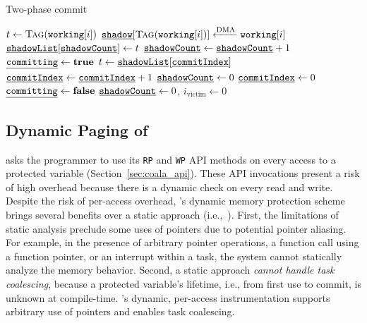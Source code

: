 \begin{algorithm}[t]
	\caption{Two-phase commit}
	\label{algo:commit}
	\small
	\begin{algorithmic}[1]
         
                \State $t \gets \Call{Tag}{\texttt{working}[i]}$
                \State $\texttt{\underline{shadow}}[\Call{Tag}{\texttt{working}[i]}] \xleftarrow{\text{DMA}} \texttt{working}[i]$
                \State $\texttt{\underline{shadowList}}[\texttt{\underline{shadowCount}}] \gets t$
                \State $\texttt{\underline{shadowCount}} \gets \texttt{\underline{shadowCount}} + 1$
            \EndFor
            \State {}
        \EndProcedure
         
            \State $\texttt{\underline{committing}} \gets \textbf{true}$
                \State $t \gets \texttt{\underline{shadowList}}[\texttt{\underline{commitIndex}}]$
                \State {}
                \State $\texttt{\underline{commitIndex}} \gets \texttt{\underline{commitIndex}} + 1$
            \EndWhile
            \State $\texttt{\underline{shadowCount}} \gets 0$
            \State $\texttt{\underline{commitIndex}} \gets 0$
            \State $\texttt{\underline{committing}} \gets \textbf{false}$
        \EndProcedure
         
             
            \EndIf
            \State $\texttt{\underline{shadowCount}} \gets 0$, $i_\text{victim} \gets 0$
        \EndProcedure
	\end{algorithmic}
\end{algorithm}

\subsection{Dynamic Paging of \sys}

\sys asks the programmer to use its {\tt RP} and {\tt WP} API methods on every access to a protected variable (Section~\ref{sec:coala_api}). These API invocations present a risk of high overhead because there is a dynamic check on every read and write. Despite the risk of per-access overhead, \sys's dynamic memory protection scheme brings several benefits over a static approach (i.e.,~\cite{alpaca}). First, the limitations of static analysis preclude some uses of pointers due to potential pointer aliasing. For example, in the presence of arbitrary pointer operations, a function call using a function pointer, or an interrupt within a task, the system cannot statically analyze the memory behavior. Second, a static approach \textit{cannot handle task coalescing}, because a protected variable's lifetime, i.e., from first use to commit, is unknown at compile-time. \sys's dynamic, per-access instrumentation supports arbitrary use of pointers and enables task coalescing.
